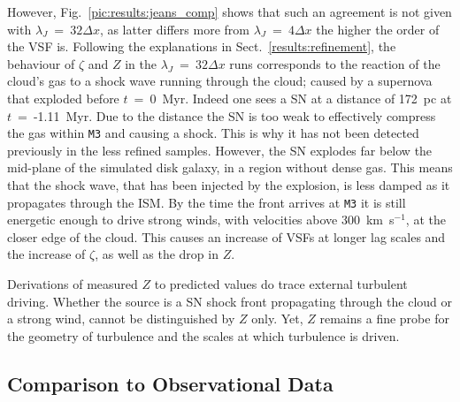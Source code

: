 However, Fig.~\ref{pic:results:jeans_comp} shows that such an agreement is not given with $\lambda_J$~=~$32\Delta{}x$, as latter differs more from $\lambda_J$~=~$4\Delta{}x$ the higher the order of the VSF is.
Following the explanations in Sect.~\ref{results:refinement}, the behaviour of $\zeta$ and $Z$ in the $\lambda_J$~=~$32\Delta{}x$ runs corresponds to the reaction of the cloud's gas to a shock wave running through the cloud; caused by a supernova that exploded before $t$~=~0~Myr. 
Indeed one sees a SN at a distance of 172~pc at $t$~=~-1.11~Myr. 
Due to the distance the SN is too weak to effectively compress the gas within \texttt{M3} and causing a shock.
This is why it has not been detected previously in the less refined samples.
However, the SN explodes far below the mid-plane of the simulated disk galaxy, in a region without dense gas.
This means that the shock wave, that has been injected by the explosion, is less damped as it propagates through the ISM. 
By the time the front arrives at \texttt{M3} it is still energetic enough to drive strong winds, with velocities above 300~km~s$^{-1}$, at the closer edge of the cloud. 
This causes an increase of VSFs at longer lag scales and the increase of $\zeta$, as well as the drop in $Z$.

Derivations of measured $Z$ to predicted values do trace external turbulent driving.
Whether the source is a SN shock front propagating through the cloud or a strong wind, cannot be distinguished by $Z$ only. 
Yet, $Z$ remains a fine probe for the geometry of turbulence and the scales at which turbulence is driven.


\subsection{Comparison to Observational Data}\label{discussion:observation}




